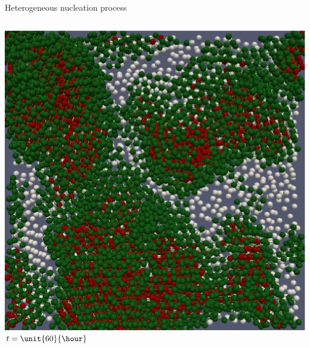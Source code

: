 \begin{frame}{Heterogeneous nucleation process}
\begin{columns}
	\bigskip\includegraphics[width=\columnwidth]{X_t299}\\
	$t=\unit{60}{\hour}$
	\end{columns}
\end{frame}

